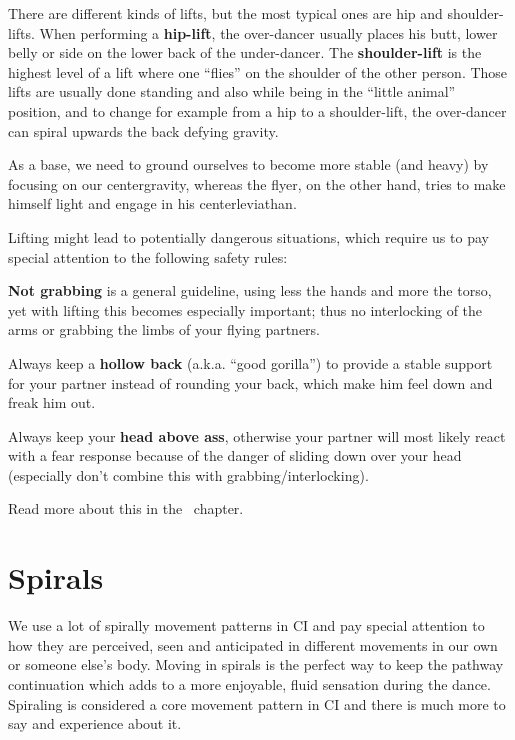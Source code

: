 There are different kinds of lifts, but the most typical ones are hip and shoulder-lifts.
When performing a \textbf{hip-lift}, the \gls{over-dancer} usually places his butt, lower belly or side on the lower back of the \gls{under-dancer}.
The \textbf{shoulder-lift} is the highest level of a lift where one ``flies'' on the shoulder of the other person.
Those lifts are usually done standing and also while being in the ``little animal'' position, and to change for example from a hip to a shoulder-lift, the over-dancer can spiral upwards the back defying gravity.

As a base, we need to ground ourselves to become more stable (and heavy) by focusing on our \gls{centergravity},
whereas the flyer, on the other hand, tries to make himself light and engage in his \gls{centerleviathan}.

Lifting might lead to potentially dangerous situations, which require us to pay special attention to the following safety rules:

\begin{itemize*}
    \item \textbf{Not grabbing} is a general guideline, using less the hands and more the torso, yet with lifting this becomes especially important; thus no interlocking of the arms or grabbing the limbs of your flying partners.
    \item Always keep a \textbf{hollow back} (a.k.a. ``good gorilla'') to provide a stable support for your partner instead of rounding your back, which make him feel down and freak him out.
    \item Always keep your \textbf{head above ass}, otherwise your partner will most likely react with a fear response because of the danger of sliding down over your head (especially don't combine this with grabbing/interlocking).
\end{itemize*}

Read more about this in the~ chapter.

\section{Spirals}\label{sec:spirals}

We use a lot of spirally movement patterns in CI and pay special attention to how they are perceived, seen and anticipated in different movements in our own or someone else's body.
Moving in spirals is the perfect way to keep the pathway continuation which adds to a more enjoyable, fluid sensation during the dance.
Spiraling is considered a core movement pattern in CI and there is much more to say and experience about it.

